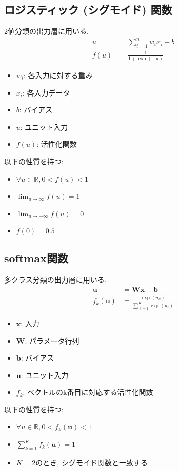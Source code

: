 \documentclass[dvipdfmx, 10pt]{jsarticle}
\begin{document}
\subsection*{ロジスティック (シグモイド) 関数}
2値分類の出力層に用いる. 
\begin{align*}
    u &= \sum_{i=1}^n w_i x_i + b \\
    f(u) &= \frac{1}{1 + \exp(-u)}
\end{align*}
\begin{itemize}
    \item $w_i$: 各入力に対する重み
    \item $x_i$: 各入力データ
    \item $b$: バイアス
    \item $u$: ユニット入力
    \item $f(u)$: 活性化関数
\end{itemize}

以下の性質を持つ: 
\begin{itemize}
    \item $\forall u \in \mathbb{R}, 0 < f(u) < 1$
    \item $\lim_{u\to \infty} f(u) = 1$
    \item $\lim_{u\to -\infty} f(u) = 0$
    \item $f(0) = 0.5$
\end{itemize}

\subsection*{softmax関数}
多クラス分類の出力層に用いる. 
\begin{align*}
    \mathbf{u} &= \mathbf{W} \mathbf{x} + \mathbf{b} \\
    f_k(\mathbf{u}) &= \frac{\exp(u_k)}{\sum^{K}_{\ell=1} \exp(u_{\ell})}
\end{align*}
\begin{itemize}
    \item $\mathbf{x}$: 入力
    \item $\mathbf{W}$: パラメータ行列
    \item $\mathbf{b}$: バイアス
    \item $\mathbf{u}$: ユニット入力
    \item $f_k$: ベクトルのk番目に対応する活性化関数
\end{itemize}

以下の性質を持つ: 
\begin{itemize}
    \item $\forall u \in \mathbb{R}, 0 < f_k(\mathbf{u}) < 1$
    \item $\sum^{K}_{k=1} f_k(\mathbf{u}) = 1$
    \item $K=2$のとき, シグモイド関数と一致する
\end{itemize}
\end{document}
